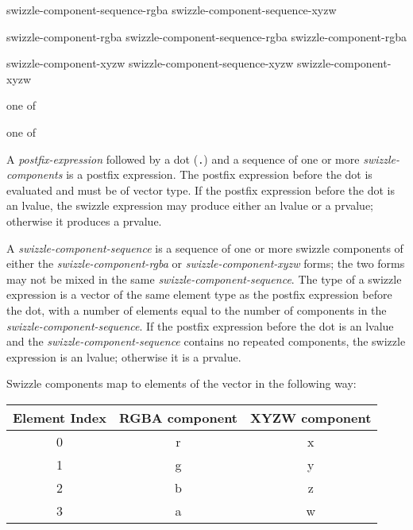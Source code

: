 
\begin{grammar}
  \br
  swizzle-component-sequence-rgba\br
  swizzle-component-sequence-xyzw\br

  \br
  swizzle-component-rgba\br
  swizzle-component-sequence-rgba swizzle-component-rgba\br

  \br
  swizzle-component-xyzw\br
  swizzle-component-sequence-xyzw swizzle-component-xyzw\br

   \textnormal{one of}\br
  \br

   \textnormal{one of}\br
\end{grammar}

\p A \textit{postfix-expression} followed by a dot (\texttt{.}) and a sequence
of one or more \textit{swizzle-components} is a postfix expression. The
postfix expression before the dot is evaluated and must be of vector type. If
the postfix expression before the dot is an lvalue, the swizzle expression may
produce either an lvalue or a prvalue; otherwise it produces a prvalue.

\p A \textit{swizzle-component-sequence} is a sequence of one or more swizzle
components of either the \textit{swizzle-component-rgba} or
\textit{swizzle-component-xyzw} forms; the two forms may not be mixed in the
same \textit{swizzle-component-sequence}. The type of a swizzle expression is a
vector of the same element type as the postfix expression before the dot, with a
number of elements equal to the number of components in the
\textit{swizzle-component-sequence}. If the postfix expression before the dot is
an lvalue and the \textit{swizzle-component-sequence} contains no repeated
components, the swizzle expression is an lvalue; otherwise it is a prvalue.

\p Swizzle components map to elements of the vector in the following way:

\begin{center}
  \begin{tabular}{|| c | c | c ||}
    \hline
    Element Index & RGBA component & XYZW component \\
    \hline
    0 & r & x \\
    1 & g & y \\
    2 & b & z \\
    3 & a & w \\
    \hline
  \end{tabular}
\end{center}

